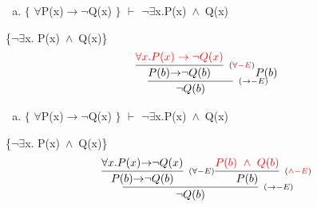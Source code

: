 \documentclass[aspectratio=43]{beamer}
\newcommand{\ria}{$\rightarrow$}
\newcommand{\fall}{$\forall$}
\newcommand{\ex}{$\exists$}
\newcommand{\nao}{$\neg$}
\newcommand{\nex}{\nao\ex}
\newcommand{\andd}{$\wedge$}
\begin{document}
    \begin{frame}[fragile]
    	
    	\begin{enumerate}[b)]
			
			\item $\{$ \fall P(x)\ria \nao Q(x) $\}$ $\vdash$ \nex  x.P(x)\ \andd\ Q(x) \\ 
			
		\end{enumerate}
        \{\nex  x. P(x)\ \andd\ Q(x)\}
        \vspace{90pt}
        \[
        \begin{array}{c}
		
        	\infer[_{(\to-E)}]
            {$\nao$ Q(b)}
            {\infer[_{(\textcolor{red}{\forall-E})}] 
            	{P(b) $\ria$ $\nao$ Q(b)}
               	{\textcolor{red}{\forall x.P(x)\rightarrow \neg Q(x)}} 
            P(b)
            }
		\end{array}
        \]
        
	\end{frame}
    
    \begin{frame}[fragile]
    	
    	\begin{enumerate}[b)]
			
			\item $\{$ \fall P(x)\ria \nao Q(x) $\}$ $\vdash$ \nex  x.P(x)\ \andd\ Q(x) \\ 
			
		\end{enumerate}
        \{\nex  x. P(x)\ \andd\ Q(x)\}
        \vspace{90pt}
        \[
        \begin{array}{c}
		
        	\infer[_{(\to-E)}]
            {$\nao$ Q(b)}
            {\infer[_{(\forall-E)}] 
            	{P(b) $\ria$ $\nao$ Q(b)}
               	{$\fall$x.P(x)$\ria$ $\nao$ Q(x)} 
            \infer[_{(\textcolor{red}{\land-E})}] 
                {P(b)} 
                {\textcolor{red}{P(b)\ \wedge\ Q(b)}}
            }
		\end{array}
        \]
        
	\end{frame}
    
\end{document}
